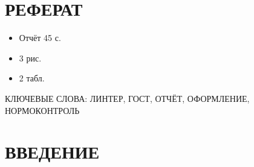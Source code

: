 \section*{РЕФЕРАТ}

\begin{itemize}
  \item Отчёт 45 с. %
  \item 3 рис.
  \item 2 табл.
\end{itemize}

КЛЮЧЕВЫЕ СЛОВА: ЛИНТЕР, ГОСТ, ОТЧЁТ, ОФОРМЛЕНИЕ, НОРМОКОНТРОЛЬ

\section*{ВВЕДЕНИЕ}
